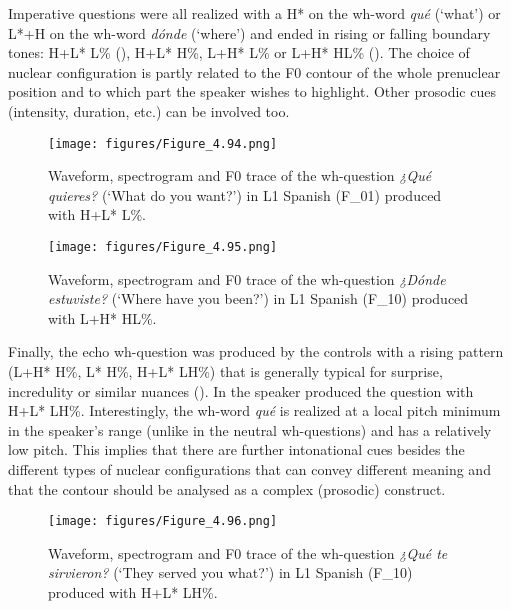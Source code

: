 Imperative questions were all realized with a H* on the wh-word \textit{qué} (‘what’) or L*+H on the wh-word \textit{dónde} (‘where’) and ended in rising or falling boundary tones: H+L* L\% (), H+L* H\%, L+H* L\% or L+H* HL\% (). The choice of nuclear configuration is partly related to the F0 contour of the whole prenuclear position and to which part the speaker wishes to highlight. Other prosodic cues (intensity, duration, etc.) can be involved too.

\begin{figure}


\texttt{[image: figures/Figure\_4.94.png]}



\caption{Waveform, spectrogram and F0 trace of the wh-question \textit{¿Qué quieres?} (‘What do you want?’) in L1 Spanish (F\_01) produced with H+L* L\%.}
\label{fig:4.94}
\end{figure}

\begin{figure}


\texttt{[image: figures/Figure\_4.95.png]}



\caption{Waveform, spectrogram and F0 trace of the wh-question \textit{¿Dónde estuviste?} (‘Where have you been?’) in L1 Spanish (F\_10) produced with L+H* HL\%.}
\label{fig:4.95}
\end{figure}

\begin{sloppypar}
Finally, the echo wh-question was produced by the controls with a rising pattern (L+H* H\%, L* H\%, H+L* LH\%) that is generally typical for surprise, incredulity or similar nuances (\citealt[382]{HualdePrieto2015}). In  the speaker produced the question with H+L* LH\%. Interestingly, the wh-word \textit{qué} is realized at a local pitch minimum in the speaker’s range (unlike in the neutral wh-questions) and has a relatively low pitch. This implies that there are further intonational cues besides the different types of nuclear configurations that can convey different meaning and that the contour should be analysed as a complex (prosodic) construct.
\end{sloppypar}

\begin{figure}


\texttt{[image: figures/Figure\_4.96.png]}



\caption{Waveform, spectrogram and F0 trace of the wh-question \textit{¿Qué te sirvieron?} (‘They served you what?’) in L1 Spanish (\mbox{F\_10}) produced with H+L* LH\%.}
\label{fig:4.96}
\end{figure}



